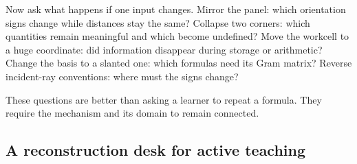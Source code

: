 Now ask what happens if one input changes. Mirror the panel: which orientation signs change while distances stay the same? Collapse two corners: which quantities remain meaningful and which become undefined? Move the workcell to a huge coordinate: did information disappear during storage or arithmetic? Change the basis to a slanted one: which formulas need its Gram matrix? Reverse incident-ray conventions: where must the signs change?

These questions are better than asking a learner to repeat a formula. They require the mechanism and its domain to remain connected.

\subsection{A reconstruction desk for active teaching}\label{02-foundations-ii-ch038-a-reconstruction-desk-for-active-teaching}

